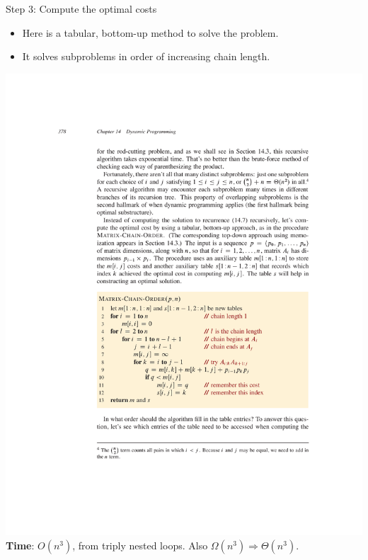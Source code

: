 \documentclass{beamer}
\begin{document}
\begin{frame}{Step 3: Compute the optimal costs}
    \begin{itemize}
        \item Here is a tabular, bottom-up method to solve the problem.
        \item It solves subproblems in order of increasing chain length.
    \end{itemize}
    \centering
    \includegraphics[width=\textwidth, trim={4cm 7.5cm 3cm 13cm}, clip]{figures/p378} \pause
    \textbf{Time}: $O(n^3)$, from triply nested loops. Also $\Omega (n^3) \Rightarrow \Theta (n^3)$.
\end{frame}
\end{document}
